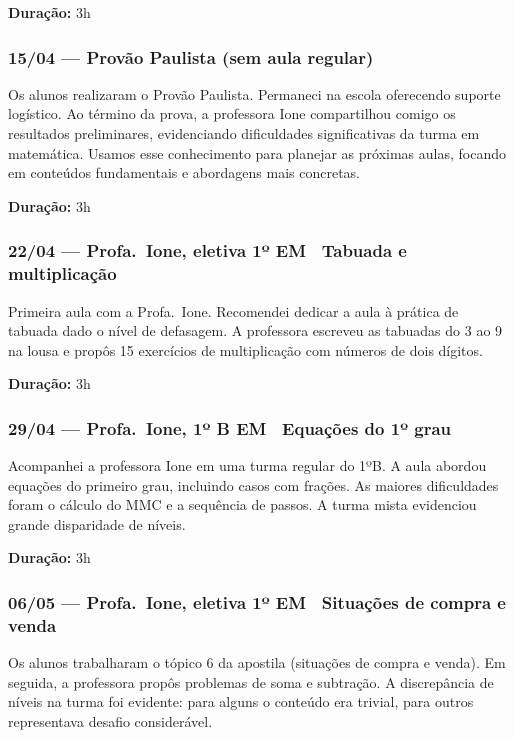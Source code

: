 \documentclass[11pt]{article}
\begin{document}
\textbf{Duração:} 3h

\subsubsection*{15/04 --- Provão Paulista (sem aula regular)}

Os alunos realizaram o Provão Paulista. Permaneci na escola oferecendo suporte logístico. Ao término da prova, a professora Ione compartilhou comigo os resultados preliminares, evidenciando dificuldades significativas da turma em matemática. Usamos esse conhecimento para planejar as próximas aulas, focando em conteúdos fundamentais e abordagens mais concretas.

\textbf{Duração:} 3h

\subsubsection*{22/04 --- Profa.\ Ione, eletiva 1º EM \textbar\ Tabuada e multiplicação}

Primeira aula com a Profa.\ Ione. Recomendei dedicar a aula à prática de tabuada dado o nível de defasagem. A professora escreveu as tabuadas do 3 ao 9 na lousa e propôs 15 exercícios de multiplicação com números de dois dígitos.

\textbf{Duração:} 3h

\subsubsection*{29/04 --- Profa.\ Ione, 1º B EM \textbar\ Equações do 1º grau}

Acompanhei a professora Ione em uma turma regular do 1ºB. A aula abordou equações do primeiro grau, incluindo casos com frações. As maiores dificuldades foram o cálculo do MMC e a sequência de passos. A turma mista evidenciou grande disparidade de níveis.

\textbf{Duração:} 3h

\subsubsection*{06/05 --- Profa.\ Ione, eletiva 1º EM \textbar\ Situações de compra e venda}

Os alunos trabalharam o tópico 6 da apostila (situações de compra e venda). Em seguida, a professora propôs problemas de soma e subtração. A discrepância de níveis na turma foi evidente: para alguns o conteúdo era trivial, para outros representava desafio considerável.
\end{document}
